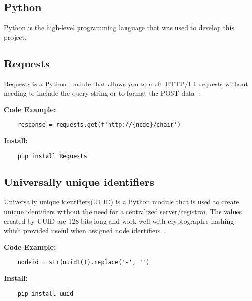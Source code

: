 \subsection{Python}

Python is the high-level programming language that was used to develop this project.

\subsection{Requests}

Requests is a Python module that allows you to craft HTTP/1.1 requests without needing to 
include the query string or to format the POST data~\cite{hid-sp18-414-www-requests-HTTP}.

\bigskip
\noindent
\textbf{Code Example:}
\begin{footnotesize}
\begin{verbatim}
    response = requests.get(f'http://{node}/chain')
\end{verbatim}
\end{footnotesize}
\noindent
\textbf{Install:}
\begin{footnotesize}
\begin{verbatim}
    pip install Requests
\end{verbatim}
\end{footnotesize}

\subsection{Universally unique identifiers}

Universally unique identifiers(UUID) is a Python module that is used to create unique 
identifiers without the need for a centralized server/registrar. The values created by UUID 
are 128 bits long and work well with cryptographic hashing which provided useful when assigned 
node identifiers~\cite{hid-sp18-414-www-uuid-objects}.

\bigskip
\noindent
\textbf{Code Example:}
\begin{footnotesize}
\begin{verbatim}
    nodeid = str(uuid1()).replace('-', '')
\end{verbatim}
\end{footnotesize}
\noindent
\textbf{Install:}
\begin{footnotesize}
\begin{verbatim}
    pip install uuid
\end{verbatim}
\end{footnotesize}

